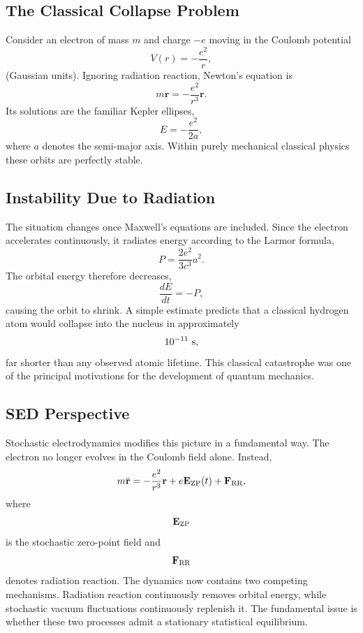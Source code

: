 \subsection{The Classical Collapse Problem}
Consider an electron of mass $m$ and charge $-e$ moving in the Coulomb
potential
\begin{equation}
V(r)=-\frac{e^2}{r},
\end{equation}
(Gaussian units).
Ignoring radiation reaction, Newton's equation is
\begin{equation}
m\ddot{\mathbf r}=-\frac{e^2}{r^3}\mathbf r.
\label{eq:CoulombNewton}
\end{equation}
Its solutions are the familiar Kepler ellipses,
\[E=-\frac{e^2}{2a},\]
where $a$ denotes the semi-major axis.
Within purely mechanical classical physics these orbits are perfectly
stable.
\subsection{Instability Due to Radiation}
The situation changes once Maxwell's equations are included.
Since the electron accelerates continuously, it radiates energy
according to the Larmor formula,
\begin{equation}
P=\frac{2e^2}{3c^3}a^2.
\label{eq:Larmor}
\end{equation}
The orbital energy therefore decreases,
\[\frac{dE}{dt}=-P,\]
causing the orbit to shrink.
A simple estimate predicts that a classical hydrogen atom would collapse
into the nucleus in approximately
\[10^{-11}\ {\rm s},\]
far shorter than any observed atomic lifetime.
This classical catastrophe was one of the principal motivations for the
development of quantum mechanics.
\subsection{SED Perspective}
Stochastic electrodynamics modifies this picture in a fundamental way.
The electron no longer evolves in the Coulomb field alone.
Instead,
\begin{equation}
m\ddot{\mathbf r}=-\frac{e^2}{r^3}\mathbf r+e\mathbf E_{\rm ZP}(t)+
    \mathbf F_{\rm RR},
\label{eq:HydrogenSED}
\end{equation}
where
\[\mathbf E_{\rm ZP}\]
is the stochastic zero-point field and
\[\mathbf F_{\rm RR}\]
denotes radiation reaction.
The dynamics now contains two competing mechanisms.
Radiation reaction continuously removes orbital energy,
while stochastic vacuum fluctuations continuously replenish it.
The fundamental issue is whether these two processes admit a stationary
statistical equilibrium.
